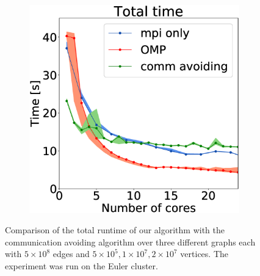 \begin{figure}[H]
\begin{subfigure}[c]{\fsize}
\includegraphics[width=\textwidth]{plots/20000our_impl}
\label{fig:mpi_omp_commavoiding_euler_3}
\end{subfigure}
    
\caption{Comparison of the total runtime of our algorithm with the communication avoiding algorithm \cite{comm_avoiding} over three different graphs each with $5\times10^{8}$ edges and $5\times10^5, 1\times10^7, 2\times10^7$ vertices. The experiment was run on the Euler
cluster.}
\label{fig:mpi_omp_commavoiding_euler}
\end{figure}

